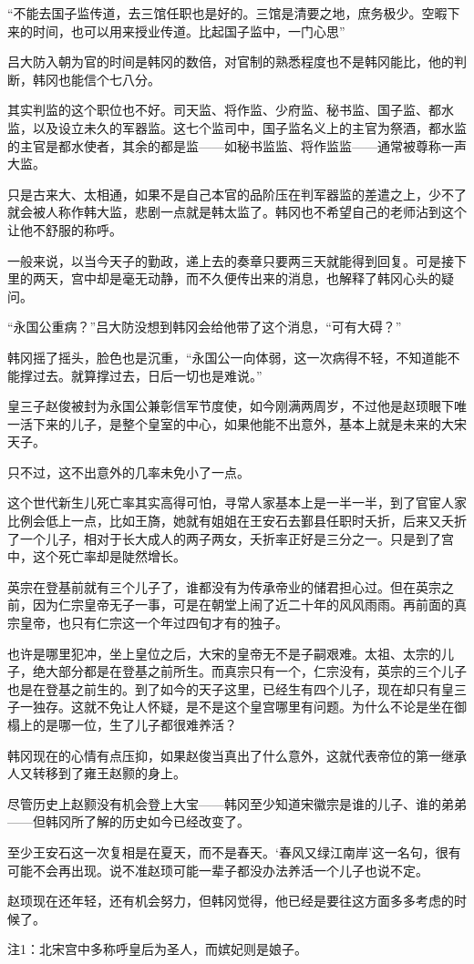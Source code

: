 “不能去国子监传道，去三馆任职也是好的。三馆是清要之地，庶务极少。空暇下来的时间，也可以用来授业传道。比起国子监中，一门心思”

吕大防入朝为官的时间是韩冈的数倍，对官制的熟悉程度也不是韩冈能比，他的判断，韩冈也能信个七八分。

其实判监的这个职位也不好。司天监、将作监、少府监、秘书监、国子监、都水监，以及设立未久的军器监。这七个监司中，国子监名义上的主官为祭酒，都水监的主官是都水使者，其余的都是监——如秘书监监、将作监监——通常被尊称一声大监。

只是古来大、太相通，如果不是自己本官的品阶压在判军器监的差遣之上，少不了就会被人称作韩大监，悲剧一点就是韩太监了。韩冈也不希望自己的老师沾到这个让他不舒服的称呼。

一般来说，以当今天子的勤政，递上去的奏章只要两三天就能得到回复。可是接下里的两天，宫中却是毫无动静，而不久便传出来的消息，也解释了韩冈心头的疑问。

“永国公重病？”吕大防没想到韩冈会给他带了这个消息，“可有大碍？”

韩冈摇了摇头，脸色也是沉重，“永国公一向体弱，这一次病得不轻，不知道能不能撑过去。就算撑过去，日后一切也是难说。”

皇三子赵俊被封为永国公兼彰信军节度使，如今刚满两周岁，不过他是赵顼眼下唯一活下来的儿子，是整个皇室的中心，如果他能不出意外，基本上就是未来的大宋天子。

只不过，这不出意外的几率未免小了一点。

这个世代新生儿死亡率其实高得可怕，寻常人家基本上是一半一半，到了官宦人家比例会低上一点，比如王旖，她就有姐姐在王安石去鄞县任职时夭折，后来又夭折了一个儿子，相对于长大成人的两子两女，夭折率正好是三分之一。只是到了宫中，这个死亡率却是陡然增长。

英宗在登基前就有三个儿子了，谁都没有为传承帝业的储君担心过。但在英宗之前，因为仁宗皇帝无子一事，可是在朝堂上闹了近二十年的风风雨雨。再前面的真宗皇帝，也只有仁宗这一个年过四旬才有的独子。

也许是哪里犯冲，坐上皇位之后，大宋的皇帝无不是子嗣艰难。太祖、太宗的儿子，绝大部分都是在登基之前所生。而真宗只有一个，仁宗没有，英宗的三个儿子也是在登基之前生的。到了如今的天子这里，已经生有四个儿子，现在却只有皇三子一独存。这就不免让人怀疑，是不是这个皇宫哪里有问题。为什么不论是坐在御榻上的是哪一位，生了儿子都很难养活？

韩冈现在的心情有点压抑，如果赵俊当真出了什么意外，这就代表帝位的第一继承人又转移到了雍王赵颢的身上。

尽管历史上赵颢没有机会登上大宝——韩冈至少知道宋徽宗是谁的儿子、谁的弟弟——但韩冈所了解的历史如今已经改变了。

至少王安石这一次复相是在夏天，而不是春天。‘春风又绿江南岸’这一名句，很有可能不会再出现。说不准赵顼可能一辈子都没办法养活一个儿子也说不定。

赵顼现在还年轻，还有机会努力，但韩冈觉得，他已经是要往这方面多多考虑的时候了。

注1：北宋宫中多称呼皇后为圣人，而嫔妃则是娘子。

